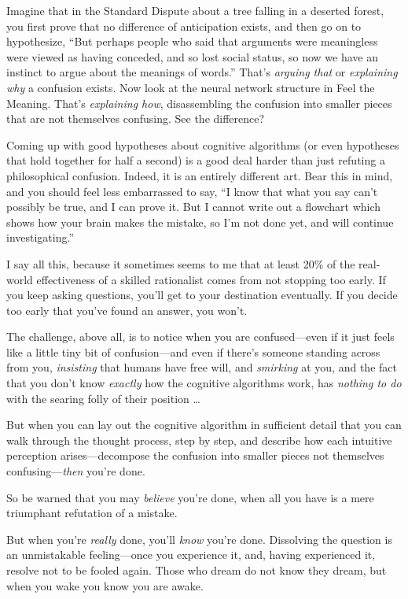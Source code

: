 {
 Imagine that in the Standard Dispute about a tree falling in a
deserted forest, you first prove that no difference of anticipation
exists, and then go on to hypothesize, ``But perhaps
people who said that arguments were meaningless were viewed as having
conceded, and so lost social status, so now we have an instinct to
argue about the meanings of words.''
That's \textit{arguing that} or \textit{explaining why}
a confusion exists. Now look at the neural network structure in Feel
the Meaning. That's \textit{explaining how},
disassembling the confusion into smaller pieces that are not themselves
confusing. See the difference?}

{
 Coming up with good hypotheses about cognitive algorithms (or even
hypotheses that hold together for half a second) is a good deal harder
than just refuting a philosophical confusion. Indeed, it is an entirely
different art. Bear this in mind, and you should feel less embarrassed
to say, ``I know that what you say
can't possibly be true, and I can prove it. But I
cannot write out a flowchart which shows how your brain makes the
mistake, so I'm not done yet, and will continue
investigating.''}

{
 I say all this, because it sometimes seems to me that at least
20\% of the real-world effectiveness of a skilled rationalist comes
from not stopping too early. If you keep asking questions,
you'll get to your destination eventually. If you
decide too early that you've found an answer, you
won't.}

{
 The challenge, above all, is to notice when you are
confused---even if it just feels like a little tiny bit of
confusion---and even if there's someone standing across
from you, \textit{insisting} that humans have free will, and
\textit{smirking} at you, and the fact that you don't
know \textit{exactly} how the cognitive algorithms work, has
\textit{nothing to do} with the searing folly of their position \ldots}

{
 But when you can lay out the cognitive algorithm in sufficient
detail that you can walk through the thought process, step by step, and
describe how each intuitive perception arises---decompose the confusion
into smaller pieces not themselves confusing---\textit{then}
you're done.}

{
 So be warned that you may \textit{believe} you're
done, when all you have is a mere triumphant refutation of a mistake.}

{
 But when you're \textit{really} done,
you'll \textit{know} you're done.
Dissolving the question is an unmistakable feeling---once you
experience it, and, having experienced it, resolve not to be fooled
again. Those who dream do not know they dream, but when you wake you
know you are awake.}

